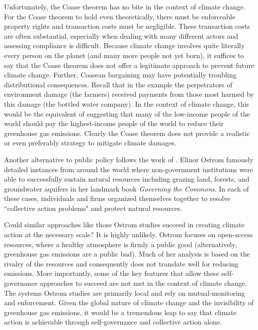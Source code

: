 Unfortunately, the Coase theorem has no bite in the context of climate change. For the Coase theorem to hold even theoretically, there must be enforceable property rights and transaction costs must be negligible. These transaction costs are often substantial, especially when dealing with many different actors and assessing compliance is difficult. Because climate change involves quite literally every person on the planet (and many more people not yet born), it suffices to say that the Coase theorem does not offer a legitimate approach to prevent future climate change. Further, Coasean bargaining may have potentially troubling distributional consequences. Recall that in the example the perpetrators of environment damage (the farmers) received payments from those most harmed by this damage (the bottled water company). In the context of climate change, this would be the equivalent of suggesting that many of the low-income people of the world should pay the highest-income people of the world to reduce their greenhouse gas emissions. Clearly the Coase theorem does not provide a realistic or even preferably strategy to mitigate climate damages. 

Another alternative to public policy follows the work of \cite{ostrom1990governing}. Elinor Ostrom famously detailed instances from around the world where non-government institutions were able to successfully sustain natural resources including grazing land, forests, and groundwater aquifers in her landmark book \textit{Governing the Commons}. In each of these cases, individuals and firms organized themselves together to resolve ``collective action problems" and protect natural resources. 

Could similar approaches like those Ostrom studies succeed in creating climate action at the necessary scale? It is highly unlikely. Ostrom focuses on open-access resources, where a healthy atmosphere is firmly a public good (alternatively, greenhouse gas emissions are a public bad). Much of her analysis is based on the rivalry of the resources and consequently does not translate well for reducing emissions. More importantly, some of the key features that allow these self-governance approaches to succeed are not met in the context of climate change. The systems Ostrom studies are primarily local and rely on mutual-monitoring and enforcement. Given the global nature of climate change and the invisibility of greenhouse gas emissions, it would be a tremendous leap to say that climate action is achievable through self-governance and collective action alone. 

